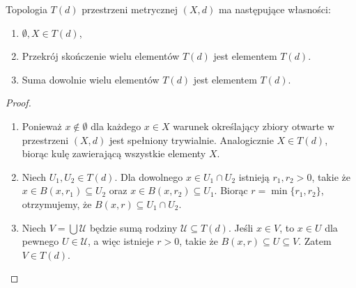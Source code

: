 \begin{theorem}
	Topologia $T\left( d \right) $ przestrzeni metrycznej $\left( X,d \right) $ ma następujące własności:
	\begin{enumerate}[label=\arabic*)]
		\item $\emptyset, X \in T\left( d \right) $,
		\item Przekrój skończenie wielu elementów $T\left( d \right) $ jest elementem $T\left( d \right) $.
		\item Suma dowolnie wielu elementów $T\left( d \right) $ jest elementem $T\left( d \right) $.
	\end{enumerate}
\end{theorem} 
\begin{proof}
	\begin{enumerate}[label=\arabic*)]
		\item Ponieważ $x \not\in \emptyset$ dla każdego $x \in X$ warunek określający zbiory otwarte w przestrzeni $\left( X,d \right) $ jest spełniony trywialnie. Analogicznie $X \in T\left( d \right) $, biorąc kulę zawierającą wszystkie elementy $X$.
		\item Niech $U_1, U_2 \in T\left( d \right) $. Dla dowolnego $x \in U_1\cap U_2$ istnieją $r_1,r_2 >0$, takie że $x \in B\left( x, r_1 \right) \subseteq U_2$ oraz $x \in B\left( x, r_2 \right) \subseteq U_1$. Biorąc $r = \min \{r_1,r_2\} $, otrzymujemy, że $B\left( x,r \right) \subseteq U_1\cap U_2$.
		\item Niech $V = \bigcup \mathcal{U} $ będzie sumą rodziny $\mathcal{U} \subseteq T\left( d \right) $. Jeśli $x \in V$, to $x \in U$ dla pewnego $U \in \mathcal{U}$, a więc istnieje $r>0$, takie że $B\left( x,r \right) \subseteq U \subseteq V$. Zatem $V \in T\left( d \right) $.
	\end{enumerate}
\end{proof} 


